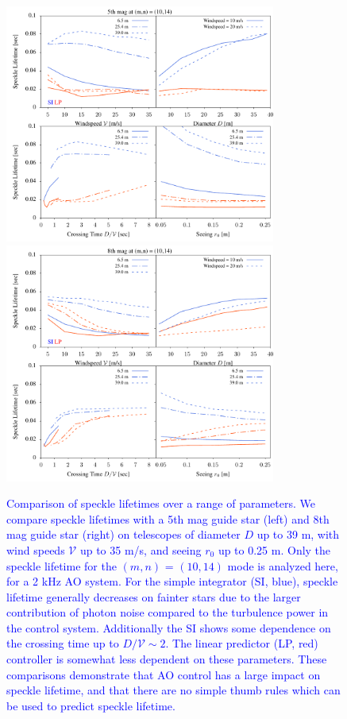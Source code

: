 \documentclass[10pt,preprint]{aastex631}
\newcommand{\jrmadd}[1]{\textcolor{blue}{#1}}
\begin{document}

\begin{figure}
    \includegraphics[width=3.5in]{scalings_rel_5.pdf}
    \includegraphics[width=3.5in]{scalings_rel_8.pdf}
    \caption{\jrmadd{Comparison of speckle lifetimes over a range of parameters.  We compare speckle lifetimes with a 5th mag guide star (left) and 8th mag guide star (right) on telescopes of diameter $D$ up to 39 m, with wind speeds $\mathcal{V}$ up to 35 m/s, and seeing $r_0$ up to 0.25 m.  Only the speckle lifetime for the $(m,n)$ = $(10,14)$ mode is analyzed here, for a 2 kHz AO system.  For the simple integrator (SI, blue), speckle lifetime generally decreases on fainter stars due to the larger contribution of photon noise compared to the turbulence power in the control system.  Additionally the SI shows some dependence on the crossing time up to $D/\mathcal{V}\sim2$.  The linear predictor (LP, red) controller is somewhat less dependent on these parameters.  These comparisons demonstrate that AO control has a large impact on speckle lifetime, and that there are no simple thumb rules which can be used to predict speckle lifetime. } \label{fig:scalings}}    
\end{figure}
\end{document}
